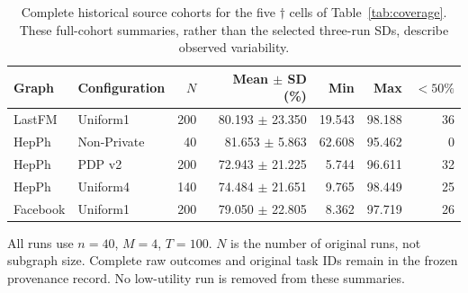 \begin{table}[htbp]
\centering\scriptsize
\caption{Complete historical source cohorts for the five $\dagger$ cells of Table~\ref{tab:coverage}. These full-cohort summaries, rather than the selected three-run SDs, describe observed variability.}\label{tab:subsetcohorts}
\begin{tabular}{llrrrrr}
\toprule
Graph & Configuration & $N$ & Mean $\pm$ SD (\%) & Min & Max & $<50\%$\\ \midrule
LastFM & Uniform1 & 200 & 80.193 $\pm$ 23.350 & 19.543 & 98.188 & 36 \\
HepPh & Non-Private & 40 & 81.653 $\pm$ 5.863 & 62.608 & 95.462 & 0 \\
HepPh & PDP v2 & 200 & 72.943 $\pm$ 21.225 & 5.744 & 96.611 & 32 \\
HepPh & Uniform4 & 140 & 74.484 $\pm$ 21.651 & 9.765 & 98.449 & 25 \\
Facebook & Uniform1 & 200 & 79.050 $\pm$ 22.805 & 8.362 & 97.719 & 26 \\
\bottomrule\end{tabular}
\par\vspace{3pt}\begin{minipage}{.97\textwidth}\footnotesize All runs use $n=40$, $M=4$, $T=100$. $N$ is the number of original runs, not subgraph size. Complete raw outcomes and original task IDs remain in the frozen provenance record. No low-utility run is removed from these summaries.\end{minipage}
\end{table}
